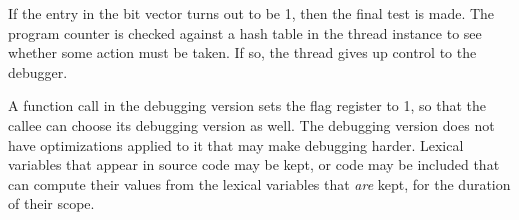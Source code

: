 If the entry in the bit vector turns out to be 1, then the final test
is made.  The program counter is checked against a hash table in the
thread instance to see whether some action must be taken.  If so, the
thread gives up control to the debugger.

A function call in the debugging version sets the flag register to 1,
so that the callee can choose its debugging version as well.  The
debugging version does not have optimizations applied to it that may
make debugging harder.  Lexical variables that appear in source code
may be kept, or code may be included that can compute their values
from the lexical variables that \emph{are} kept, for the duration of
their scope.


